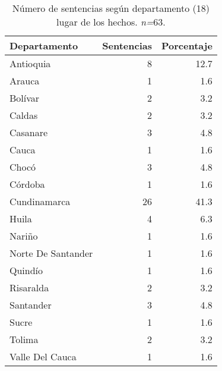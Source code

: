 \begin{table}[!htbp]
\centering
\caption{Número de sentencias según departamento (18) lugar de los hechos. \textit{n=}63.} 
\label{tab:dephec}
\begin{tabular}{lrr}
  \hline
Departamento & Sentencias & Porcentaje \\ 
  \hline
Antioquia &  8 & 12.7 \\ 
  Arauca &  1 & 1.6 \\ 
  Bolívar &  2 & 3.2 \\ 
  Caldas &  2 & 3.2 \\ 
  Casanare &  3 & 4.8 \\ 
  Cauca &  1 & 1.6 \\ 
  Chocó &  3 & 4.8 \\ 
  Córdoba &  1 & 1.6 \\ 
  Cundinamarca & 26 & 41.3 \\ 
  Huila &  4 & 6.3 \\ 
  Nariño &  1 & 1.6 \\ 
  Norte De Santander &  1 & 1.6 \\ 
  Quindío &  1 & 1.6 \\ 
  Risaralda &  2 & 3.2 \\ 
  Santander &  3 & 4.8 \\ 
  Sucre &  1 & 1.6 \\ 
  Tolima &  2 & 3.2 \\ 
  Valle Del Cauca &  1 & 1.6 \\ 
   \hline
\end{tabular}
\end{table}
